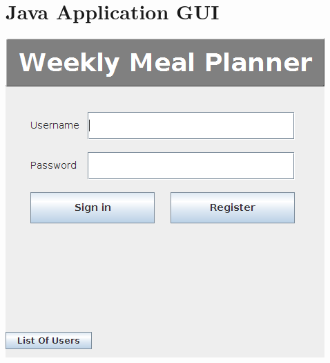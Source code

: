 \documentclass[a4paper,10pt,toc=graduated]{article}
\begin{document}
\begin{appendices}
\begin{center}
\end{center}
\section{Java Application GUI}
\includegraphics{screenshots/frmLogin.png}


\end{appendices}
\end{document}

